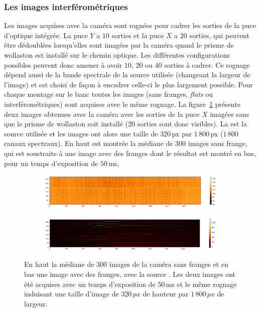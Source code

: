 \subsubsection{Les images interférométriques}

Les images acquises avec la caméra sont rognées pour cadrer les sorties de la puce d'optique intégrée. La puce $Y$ a $10$ sorties et la puce $X$ a $20$ sorties, qui peuvent être dédoublées lorsqu'elles sont imagées par la caméra quand le prisme de wollaston est installé sur le chemin optique. Les différentes configurations possibles peuvent donc amener à avoir $10$, $20$ ou $40$ sorties à cadrer. Ce rognage dépend aussi de la bande spectrale de la source utilisée (changeant la largeur de l'image) et est choisi de façon à encadrer celle-ci le plus largement possible. Pour chaque montage sur le banc toutes les images (sans franges, \textit{flats} ou interférométriques) sont acquises avec le même rognage. La figure~\ref{fig:FringeCrop} présente deux images obtenues avec la caméra avec les sorties de la puce $X$ imagées sans que le prisme de wollaston soit installé ($20$ sorties sont donc visibles). La \sk est la source utilisée et les images ont alors une taille de $320 \,$px par $1\,800 \,$px ($1\,800$ canaux spectraux). En haut est montrée la médiane de $300$ images sans frange, qui est soustraite à une image avec des franges dont le résultat est montré en bas, pour un temps d'exposition de $50 \,$ms.

\begin{figure}[ht!]
    \centering
    \begin{subfigure}{\textwidth}
        \includegraphics[width=\textwidth]{Figure_Chap3/20220614_P2VM_Dark1_50ms_median300.png}
    \end{subfigure}
    \begin{subfigure}{\textwidth}
        \includegraphics[width=\textwidth]{Figure_Chap3/20220614_P2VM_FullOn_001_50ms_Im0_SubDark.png}
    \end{subfigure}
    \caption[Image interférométrique obtenues sur FIRSTv2.]{En haut la médiane de $300$ images de la caméra sans franges et en bas une image avec des franges, avec la source \sk. Les deux images ont été acquises avec un temps d'exposition de $50 \,$ms et le même rognage induisant une taille d'image de $320 \, px$ de hauteur par $1\,800 \, px$ de largeur.}
    \label{fig:FringeCrop}
\end{figure}

